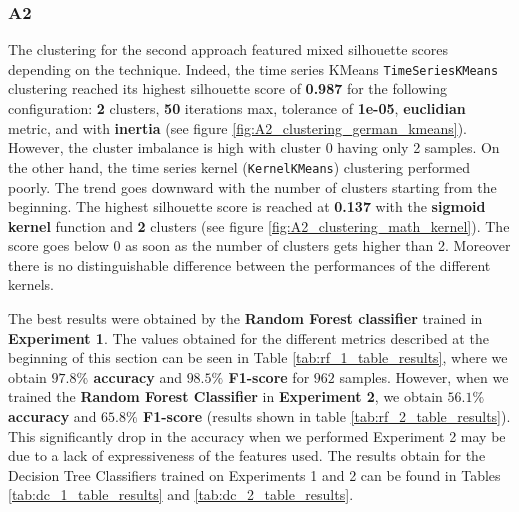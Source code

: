 \documentclass[sigplan,screen]{acmart}
\begin{document}
\subsubsection{A2}

The clustering for the second approach featured mixed silhouette scores depending on the technique. Indeed, the time series KMeans \texttt{TimeSeriesKMeans} clustering reached its highest silhouette score of \textbf{0.987} for the following configuration: \textbf{2} clusters, \textbf{50} iterations max, tolerance of \textbf{1e-05}, \textbf{euclidian} metric, and with \textbf{inertia} (see figure \ref{fig:A2_clustering_german_kmeans}). However, the cluster imbalance is high with cluster 0 having only 2 samples.
On the other hand, the time series kernel (\texttt{KernelKMeans}) clustering performed poorly. The trend goes downward with the number of clusters starting from the beginning. The highest silhouette score is reached at \textbf{0.137} with the \textbf{sigmoid kernel} function and \textbf{2} clusters (see figure \ref{fig:A2_clustering_math_kernel}). The score goes below 0 as soon as the number of clusters gets higher than 2. Moreover there is no distinguishable difference between the performances of the different kernels.

The best results were obtained by the \textbf{Random Forest classifier} trained in \textbf{Experiment 1}. The values obtained for the different metrics described at the beginning of this section can be seen in Table \ref{tab:rf_1_table_results}, where we obtain \textbf{$97.8\%$ accuracy} and \textbf{$98.5\%$ F1-score} for $962$ samples. However, when we trained the \textbf{Random Forest Classifier} in \textbf{Experiment 2}, we obtain \textbf{$56.1\%$ accuracy} and \textbf{$65.8\%$ F1-score} (results shown in table \ref{tab:rf_2_table_results}). This significantly drop in the accuracy when we performed Experiment 2 may be due to a lack of expressiveness of the features used. The results obtain for the Decision Tree Classifiers trained on Experiments 1 and 2 can be found in Tables \ref{tab:dc_1_table_results} and \ref{tab:dc_2_table_results}.
\end{document}
